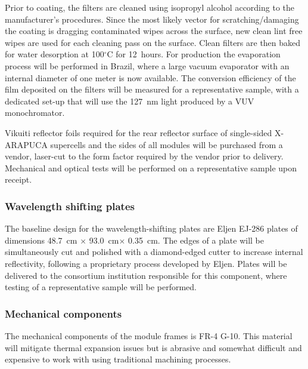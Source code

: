 Prior to coating, the filters are cleaned using isopropyl alcohol according to the manufacturer's procedures. %
Since the most likely vector for scratching/damaging the coating is dragging contaminated wipes across the surface, new clean lint free wipes are used for each cleaning pass on the surface. Clean filters are then baked for water desorption at 100$^\circ$C for \SI{12}{hours}. 
For   production the evaporation process will be performed
in Brazil, 
where a large vacuum evaporator with an internal diameter of one meter is now available. The conversion efficiency of the film deposited on the filters will be measured for a representative sample, with a dedicated set-up that will use the \SI{127}{nm} light produced by a VUV monochromator.

Vikuiti reflector foils required for the rear reflector surface of single-sided X-ARAPUCA supercells and the sides of all modules will be purchased from a vendor, laser-cut to the form factor required by the vendor prior to delivery.  Mechanical and optical  tests will be performed on a representative sample upon receipt.

\subsubsection{Wavelength shifting plates}

The baseline design for the wavelength-shifting plates are %
Eljen EJ-286 plates of dimensions \SI{48.7}{cm} $\times$ \SI{93.0}{cm}$\times$ \SI{0.35}{cm}.  The edges of a plate will be simultaneously cut and polished with a diamond-edged cutter to increase internal reflectivity, following a proprietary process developed by Eljen.  Plates will be delivered to the consortium institution responsible for this component, where  testing of a representative sample will be performed.

\subsubsection{Mechanical components}

The mechanical components %
of the  module frames is %
FR-4 G-10.  %
This material will mitigate thermal expansion issues %
but is abrasive and somewhat difficult and expensive to work with using traditional machining processes.

